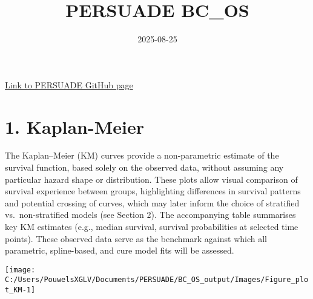 \documentclass[
]{article}
\title{PERSUADE BC\_OS}
\author{}
\date{\vspace{-2.5em}2025-08-25}
\begin{document}
\maketitle

{
\hypersetup{linkcolor=}
\setcounter{tocdepth}{2}
\tableofcontents
}
\hfill\break

\href{https://github.com/Bram-R/PERSUADE}{Link to PERSUADE GitHub page}

\clearpage

\section{1. Kaplan-Meier}\label{kaplan-meier}

The Kaplan--Meier (KM) curves provide a non-parametric estimate of the
survival function, based solely on the observed data, without assuming
any particular hazard shape or distribution. These plots allow visual
comparison of survival experience between groups, highlighting
differences in survival patterns and potential crossing of curves, which
may later inform the choice of stratified vs.~non-stratified models (see
Section 2). The accompanying table summarises key KM estimates (e.g.,
median survival, survival probabilities at selected time points). These
observed data serve as the benchmark against which all parametric,
spline-based, and cure model fits will be assessed.

\clearpage

\begin{flushleft}\texttt{[image: C:/Users/PouwelsXGLV/Documents/PERSUADE/BC\_OS\_output/Images/Figure\_plot\_KM-1]} \end{flushleft}

\begin{table}[H]
\centering
\caption{\label{tab:Table_1}Observed survival data}
\centering
{}
\end{table}
\end{document}
